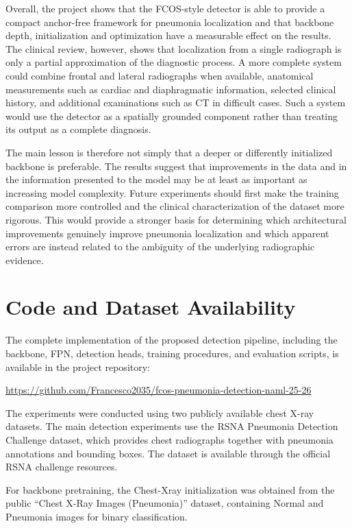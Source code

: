 \documentclass[11pt,a4paper]{article}
\begin{document}
Overall, the project shows that the FCOS-style detector is able to provide a
compact anchor-free framework for pneumonia localization and that backbone
depth, initialization and optimization have a measurable effect on the
results. The clinical review, however, shows that localization from a single
radiograph is only a partial approximation of the diagnostic process. A more
complete system could combine frontal and lateral radiographs when available,
anatomical measurements such as cardiac and diaphragmatic information,
selected clinical history, and additional examinations such as CT in difficult
cases. Such a system would use the detector as a spatially grounded component
rather than treating its output as a complete diagnosis.

The main lesson is therefore not simply that a deeper or differently
initialized backbone is preferable. The results suggest that improvements in
the data and in the information presented to the model may be at least as
important as increasing model complexity. Future experiments should first make
the training comparison more controlled and the clinical characterization of
the dataset more rigorous. This would provide a stronger basis for determining
which architectural improvements genuinely improve pneumonia localization and
which apparent errors are instead related to the ambiguity of the underlying
radiographic evidence.


\section{Code and Dataset Availability}
\label{sec:code_dataset_availability}

The complete implementation of the proposed detection pipeline, including the
backbone, FPN, detection heads, training procedures, and evaluation scripts,
is available in the project repository:

\begin{center}
\url{https://github.com/Francesco2035/fcos-pneumonia-detection-naml-25-26}
\end{center}

The experiments were conducted using two publicly available chest X-ray
datasets. The main detection experiments use the RSNA Pneumonia Detection
Challenge dataset, which provides chest radiographs together with pneumonia
annotations and bounding boxes. The dataset is available through the official
RSNA challenge resources.

For backbone pretraining, the Chest-Xray initialization was obtained from the
public ``Chest X-Ray Images (Pneumonia)'' dataset, containing Normal and
Pneumonia images for binary classification.
\end{document}
